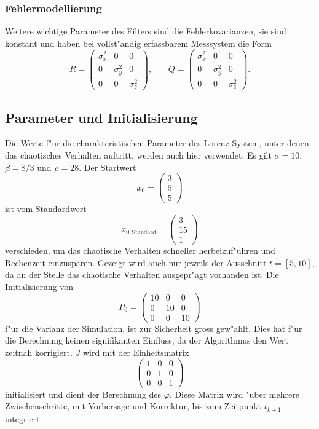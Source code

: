 \begin{refsection}
\subsubsection{Fehlermodellierung}
Weitere wichtige Parameter des Filters sind die Fehlerkovarianzen, sie sind konstant und haben bei vollst"andig erfassbarem Messsystem die Form
\[R=\begin{pmatrix}
\sigma^{2}_{x} & 0 & 0 \\ 
0 & \sigma^{2}_{y} & 0 \\ 
0 & 0 & \sigma^{2}_{z}
\end{pmatrix}  \text{,}\qquad
Q=\begin{pmatrix}
\sigma^{2}_{x} & 0 & 0 \\ 
0 & \sigma^{2}_{y} & 0 \\ 
0 & 0 & \sigma^{2}_{z}
\end{pmatrix}.
\]

\subsection{Parameter und Initialisierung}
Die Werte f"ur die charakteristischen Parameter des Lorenz-System, unter denen das chaotisches Verhalten auftritt, werden auch hier verwendet. Es gilt $\sigma=10$, $\beta=8/3$ und $\rho=28$. Der Startwert
\[
x_{0}=\begin{pmatrix}
3 \\ 
5 \\ 
5
\end{pmatrix}
\]
ist vom Standardwert
\[
x_{0,\text{Standard}}=
\begin{pmatrix}
3\\
15\\
1
\end{pmatrix}\]
verschieden, um das chaotische Verhalten schneller herbeizuf"uhren und Rechenzeit einzusparen. Gezeigt wird auch nur jeweils der Ausschnitt $t = [5,10]$, da an der Stelle das chaotische Verhalten ausgepr"agt vorhanden ist. 
Die Initialisierung von
\[
P_{0}=\begin{pmatrix}
10 & 0 & 0 \\ 
0 & 10 & 0 \\ 
0 & 0 & 10
\end{pmatrix}
\]
f"ur die Varianz der Simulation, ist zur Sicherheit gross gew"ahlt. Dies hat f"ur die Berechnung keinen signifikanten Einfluss, da der Algorithmus den Wert zeitnah korrigiert. $J$ wird mit der Einheitsmatrix
\[
\begin{pmatrix}
1 & 0 & 0 \\ 
0 & 1 & 0 \\ 
0 & 0 & 1
\end{pmatrix} 
\]
initialisiert und dient der Berechnung des $\varphi$. Diese Matrix wird "uber mehrere Zwischenschritte, mit Vorhersage und Korrektur, bis zum Zeitpunkt $t_{k+1}$ integriert.


\end{refsection}
